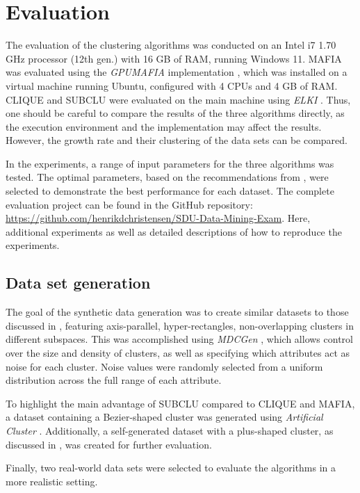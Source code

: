 \section{Evaluation}
The evaluation of the clustering algorithms was conducted on an Intel i7 1.70 GHz processor (12th gen.) with 16 GB of RAM, running Windows 11. MAFIA was evaluated using the \textit{GPUMAFIA} implementation \cite{gpumafia}, which was installed on a virtual machine running Ubuntu, configured with 4 CPUs and 4 GB of RAM. CLIQUE and SUBCLU were evaluated on the main machine using \textit{ELKI} \cite{elki}. Thus, one should be careful to compare the results of the three algorithms directly, as the execution environment and the implementation may affect the results. However, the growth rate and their clustering of the data sets can be compared.

In the experiments, a range of input parameters for the three algorithms was tested. The optimal parameters, based on the recommendations from \cite[p.~352]{sim-2012}, were selected to demonstrate the best performance for each dataset. The complete evaluation project can be found in the GitHub repository: \url{https://github.com/henrikdchristensen/SDU-Data-Mining-Exam}. Here, additional experiments as well as detailed descriptions of how to reproduce the experiments.

\subsection{Data set generation}
The goal of the synthetic data generation was to create similar datasets to those discussed in \cite{clique,mafia}, featuring axis-parallel, hyper-rectangles, non-overlapping clusters in different subspaces. This was accomplished using \textit{MDCGen} \cite{mdcgen}, which allows control over the size and density of clusters, as well as specifying which attributes act as noise for each cluster. Noise values were randomly selected from a uniform distribution across the full range of each attribute.

To highlight the main advantage of SUBCLU compared to CLIQUE and MAFIA, a dataset containing a Bezier-shaped cluster was generated using \textit{Artificial Cluster} \cite{ac}. Additionally, a self-generated dataset with a plus-shaped cluster, as discussed in \cite{mafia}, was created for further evaluation.

Finally, two real-world data sets were selected to evaluate the algorithms in a more realistic setting.

